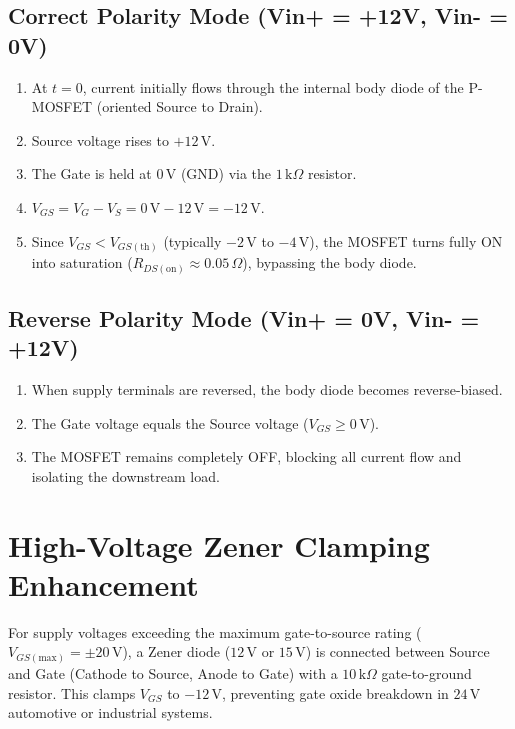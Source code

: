 \documentclass[11pt,a4paper]{article}
\begin{document}
\subsection{Correct Polarity Mode (Vin+ = +12V, Vin- = 0V)}
\begin{enumerate}
    \item At $t=0$, current initially flows through the internal body diode of the P-MOSFET (oriented Source to Drain).
    \item Source voltage rises to $+12\,\text{V}$.
    \item The Gate is held at $0\,\text{V}$ (GND) via the $1\,\text{k}\Omega$ resistor.
    \item $V_{GS} = V_G - V_S = 0\,\text{V} - 12\,\text{V} = -12\,\text{V}$.
    \item Since $V_{GS} < V_{GS(\text{th})}$ (typically $-2\,\text{V}$ to $-4\,\text{V}$), the MOSFET turns fully ON into saturation ($R_{DS(\text{on})} \approx 0.05\,\Omega$), bypassing the body diode.
\end{enumerate}

\subsection{Reverse Polarity Mode (Vin+ = 0V, Vin- = +12V)}
\begin{enumerate}
    \item When supply terminals are reversed, the body diode becomes reverse-biased.
    \item The Gate voltage equals the Source voltage ($V_{GS} \ge 0\,\text{V}$).
    \item The MOSFET remains completely OFF, blocking all current flow and isolating the downstream load.
\end{enumerate}

\section{High-Voltage Zener Clamping Enhancement}
For supply voltages exceeding the maximum gate-to-source rating ($V_{GS(\text{max})} = \pm 20\,\text{V}$), a Zener diode ($12\,\text{V}$ or $15\,\text{V}$) is connected between Source and Gate (Cathode to Source, Anode to Gate) with a $10\,\text{k}\Omega$ gate-to-ground resistor. This clamps $V_{GS}$ to $-12\,\text{V}$, preventing gate oxide breakdown in $24\,\text{V}$ automotive or industrial systems.
\end{document}
